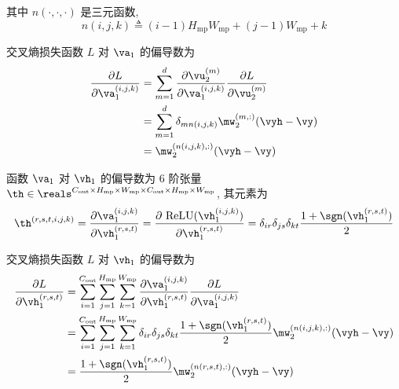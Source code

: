 \documentclass[openany]{ctexbook}
\theoremstyle{kaiti}
\theoremstyle{normal}
\begin{document}
其中 $n(\cdot,\cdot,\cdot)$ 是三元函数,
\begin{equation}
  n(i,j,k)\triangleq(i-1)H_{\text{mp}}W_{\text{mp}}+(j-1)W_{\text{mp}}+k
\end{equation}

交叉熵损失函数 $L$ 对 $\va_1$ 的偏导数为
\begin{equation}
  \begin{aligned}
    \frac{\partial L}{\partial\va_1^{(i,j,k)}}
    &=\sum_{m=1}^d\frac{\partial\vu_2^{(m)}}{\partial\va_1^{(i,j,k)}}\frac{\partial L}{\partial\vu_2^{(m)}}\\
    &=\sum_{m=1}^d\delta_{mn(i,j,k)}\mw_2^{(m,:)}(\vyh-\vy)\\
    &=\mw_2^{(n(i,j,k),:)}(\vyh-\vy)\\
  \end{aligned}
\end{equation}

函数 $\va_1$ 对 $\vh_1$ 的偏导数为 6 阶张量 $\th\in\reals^{C_{\text{out}}\times H_{\text{mp}}\times W_{\text{mp}}\times C_{\text{out}}\times H_{\text{mp}}\times W_{\text{mp}}}$, 其元素为
\begin{equation}
  \th^{(r,s,t,i,j,k)}
  =\frac{\partial\va_1^{(i,j,k)}}{\partial\vh_1^{(r,s,t)}}
  =\frac{\partial~\mathrm{ReLU}(\vh_1^{(i,j,k)})}{\partial\vh_1^{(r,s,t)}}
  =\delta_{ir}\delta_{js}\delta_{kt}\frac{1+\sgn(\vh_1^{(r,s,t)})}{2}
\end{equation}

交叉熵损失函数 $L$ 对 $\vh_1$ 的偏导数为
\begin{equation}
  \begin{aligned}
    \frac{\partial L}{\partial\vh_1^{(r,s,t)}}
    &=\sum_{i=1}^{C_{\text{out}}}\sum_{j=1}^{H_{\text{mp}}}\sum_{k=1}^{W_{\text{mp}}}\frac{\partial\va_1^{(i,j,k)}}{\partial\vh_1^{(r,s,t)}}\frac{\partial L}{\partial\va_1^{(i,j,k)}}\\
    &=\sum_{i=1}^{C_{\text{out}}}\sum_{j=1}^{H_{\text{mp}}}\sum_{k=1}^{W_{\text{mp}}}\delta_{ir}\delta_{js}\delta_{kt}\frac{1+\sgn(\vh_1^{(r,s,t)})}{2}\mw_2^{(n(i,j,k),:)}(\vyh-\vy)\\
    &=\frac{1+\sgn(\vh_1^{(r,s,t)})}{2}\mw_2^{(n(r,s,t),:)}(\vyh-\vy)
  \end{aligned}
\end{equation}
\end{document}
